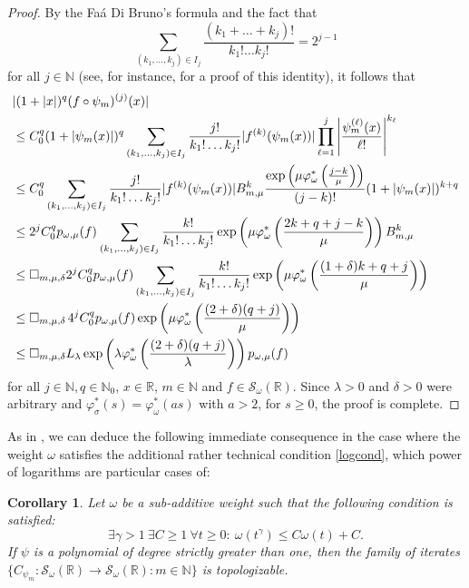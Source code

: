 \documentclass[12pt,reqno]{amsart} %
\newtheorem{corollary}[theorem]{Corollary}
\numberwithin{equation}{section}
\begin{document}
\begin{proof}
	By the  Fa\'a Di Bruno's formula and the fact that $$\sum_{(k_1,...,k_j)\in I_j} \frac{(k_1+\ldots+k_j)!}{k_1! \ldots k_j!}=2^{j-1}$$ for all $j\in\mathbb{N}$ (see, for instance, \cite{jmaa}  for a  proof of this identity), it follows that 
	\begin{align*}
		&|(1+|x|)^q (f\circ \psi_m)^{(j)}(x)|\\
		&\leq  
		C_0^q (1+|\psi_m(x)|)^q \sum_{(k_1,...,k_j)\in I_j} \frac{j!}{k_1! \ldots k_j!} |f^{(k)}(\psi_m(x))| \prod_{\ell=1}^j \left|\frac{\psi_m^{(\ell)}(x)}{\ell!}\right|^{k_\ell}\\
		&\leq  
		C_0^q \sum_{(k_1,...,k_j)\in I_j} \frac{j!}{k_1! \ldots k_j!} |f^{(k)}(\psi_m(x))| B_{m,\mu}^k \frac{\exp\left(\mu \varphi^*_\omega\left(\frac{j-k}{\mu}\right)\right)}{(j-k)!} (1+|\psi_m(x)|)^{k+q}   \\
		& \leq 2^j  C_0^q   p_{\omega,\mu}(f) \hspace{0.02cm} \sum_{(k_1,...,k_j)\in I_j} \frac{k!}{k_1! \ldots k_j!}  \exp\left(\mu \varphi^*_\omega\left(\frac{2k+q+j-k}{\mu}\right)\right) B_{m,\mu}^k \\
		& \leq \square_{m,\mu,\delta} 2^j  C_0^q p_{\omega,\mu}(f)    \sum_{(k_1,...,k_j)\in I_j} \frac{k!}{k_1! \ldots k_j!}  \exp\left(\mu \varphi^*_\omega\left(\frac{(1+\delta)k+q+j}{\mu}\right)\right)     \\ 
		&\leq \square_{m,\mu,\delta} \hspace{0.05cm} 4^j  C_0^q p_{\omega,\mu}(f)   \exp\left(\mu \varphi^*_\omega\left(\frac{(2+\delta)(q+j)}{\mu}\right)\right) \\ &\leq \square_{m,\mu,\delta} L_{\lambda} \exp\left(\lambda \varphi^*_\omega\left(\frac{(2+\delta)(q+j)}{\lambda}\right)\right) p_{\omega,\mu}(f)
\end{align*}
for all $j\in\mathbb{N}, q\in\mathbb{N}_0$, $x\in\mathbb{R}$, $m\in\mathbb{N}$ and $f\in \mathcal{S}_{\omega}(\mathbb{R})$. Since $\lambda>0$ and $\delta>0$ were arbitrary and $\varphi^*_\sigma(s)=\varphi^*_\omega(as)$ with $a>2$, for $s\geq 0$,  the proof is complete.
\end{proof}


As in \cite[Corollary 3.5]{RACSAM}, we can deduce the following immediate consequence in the case where the weight $\omega$ satisfies the additional rather technical condition \eqref{logcond}, which power of logarithms are particular cases of: 
\begin{corollary}
Let $\omega$ be a sub-additive weight such that the following condition is satisfied: 
\begin{equation}\label{logcond}    
	\exists \gamma > 1\ \exists C\geq 1\ \forall t\geq 0:\ \omega(t^\gamma)\leq C\omega(t) + C. 
\end{equation} 
If $\psi$ is a polynomial of degree strictly greater than one, then the family of iterates $\{C_{\psi_m}:\mathcal{S}_{\omega}(\mathbb{R})\to \mathcal{S}_{\omega}(\mathbb{R}):m\in\mathbb{N}\}$ is topologizable. 
\end{corollary}
\end{document}
